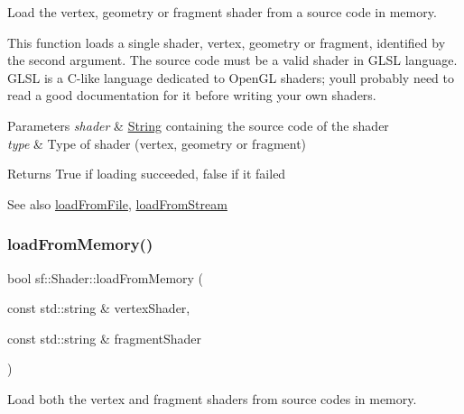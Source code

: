 Load the vertex, geometry or fragment shader from a source code in memory. 

This function loads a single shader, vertex, geometry or fragment, identified by the second argument. The source code must be a valid shader in G\+L\+SL language. G\+L\+SL is a C-\/like language dedicated to Open\+GL shaders; you\textquotesingle{}ll probably need to read a good documentation for it before writing your own shaders.


\begin{DoxyParams}{Parameters}
{\em shader} & \mbox{\hyperlink{classsf_1_1_string}{String}} containing the source code of the shader \\
\hline
{\em type} & Type of shader (vertex, geometry or fragment)\\
\hline
\end{DoxyParams}
\begin{DoxyReturn}{Returns}
True if loading succeeded, false if it failed
\end{DoxyReturn}
\begin{DoxySeeAlso}{See also}
\mbox{\hyperlink{classsf_1_1_shader_a053a5632848ebaca2fcd8ba29abe9e6e}{load\+From\+File}}, \mbox{\hyperlink{classsf_1_1_shader_a2ee1b130c0606e4f8bcdf65c1efc2a53}{load\+From\+Stream}} \begin{DoxyVerb}\end{DoxyVerb}
 
\end{DoxySeeAlso}
\mbox{\label{classsf_1_1_shader_ae34e94070d7547a890166b7993658a9b}} 
\subsubsection{\texorpdfstring{loadFromMemory()}{loadFromMemory()}\hspace{0.1cm}{\footnotesize\ttfamily [2/3]}}
{\footnotesize\ttfamily bool sf\+::\+Shader\+::load\+From\+Memory (\begin{DoxyParamCaption}\item[{const std\+::string \&}]{vertex\+Shader,  }\item[{const std\+::string \&}]{fragment\+Shader }\end{DoxyParamCaption})}



Load both the vertex and fragment shaders from source codes in memory. 

